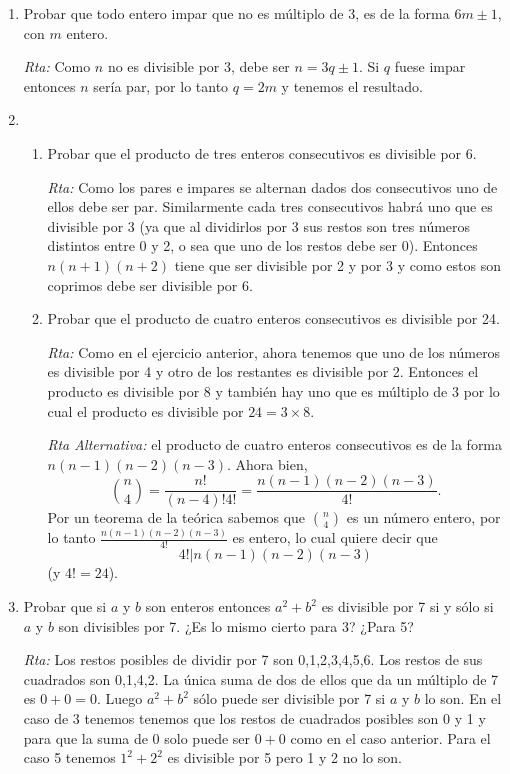 \documentclass[a4paper,12pt,twoside,spanish,reqno]{amsbook}
\numberwithin{equation}{section}
\newcommand{\rta}{\noindent\textit{Rta: }}
\begin{document}
\begin{enumerate}
\item Probar que todo entero impar que no es múltiplo de 3, es de la forma $6m\pm 1$, con $m$ entero.

\rta Como $n$ no es divisible por 3, debe ser $n=3q\pm1$. Si $q$ fuese impar entonces $n$ sería par, por lo tanto $q=2m$  y tenemos el resultado.



\item 
\begin{enumerate}
    \item Probar que el producto de tres enteros consecutivos es divisible por 6.
    
    \rta Como los pares e impares se alternan dados dos consecutivos uno de ellos debe ser par. 
    Similarmente cada tres consecutivos habrá uno que es divisible por 3 (ya que al dividirlos por 3 sus restos son tres números distintos entre 0 y 2, o sea que uno de los restos debe ser 0). Entonces $n(n+1)(n+2)$ tiene que ser divisible por 2 y por 3 y como estos son coprimos debe ser divisible por 6.
    
    \item Probar que el producto de cuatro enteros consecutivos es divisible por 24.
    
    \rta Como en el ejercicio anterior, ahora tenemos que uno de los números es divisible por 4 y otro de los restantes es divisible por 2. Entonces el producto es divisible por 8 y también hay uno que es múltiplo de 3 por lo cual el producto es divisible por $24=3\times8$.
    
    \textit{Rta Alternativa:} el producto de cuatro enteros consecutivos es de la forma $n(n-1)(n-2)(n-3)$. Ahora bien,
    \begin{equation*}
        \binom{n}{4} = \frac{n!}{(n-4)!4!} = \frac{n(n-1)(n-2)(n-3)}{4!}.
    \end{equation*}
    Por un teorema de la teórica sabemos que $\displaystyle\binom{n}{4}$ es un número entero, por lo tanto $ \displaystyle\frac{n(n-1)(n-2)(n-3)}{4!}$ es entero, lo cual quiere decir que $$4! | n(n-1)(n-2)(n-3)$$ (y $4! = 24$). 
    
\end{enumerate}




\item Probar que si $a$ y $b$ son enteros entonces $a^2+b^2$ es divisible por 7 si y s\'olo si $a$ y $b$ son divisibles por 7. ¿Es lo mismo cierto para 3? ¿Para 5?

\rta Los restos posibles de dividir por 7 son 0,1,2,3,4,5,6. Los restos de sus cuadrados son 0,1,4,2. La única suma de dos de ellos que da un múltiplo de 7 es $0+0=0$. Luego $a^2+b^2$ sólo puede ser divisible por 7 si $a$ y $b$ lo son.
En el caso de 3 tenemos tenemos que los restos de cuadrados posibles son 0 y 1 y para que la suma de 0 solo puede ser $0+0$ como en el caso anterior. Para el caso 5 tenemos $1^2+2^2$ es divisible por 5 pero 1 y 2 no lo son.





\end{enumerate}
\end{document}

